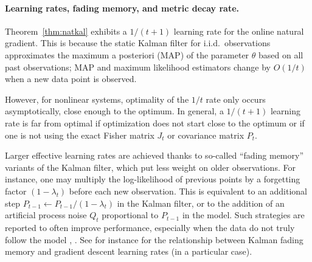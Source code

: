 \documentclass[11pt,a4paper]{article}
\newcommand{\1}{\mathbbm{1}}
\theoremstyle{yannthm}
\theoremstyle{yannthm2}
\numberwithin{equation}{section}
\begin{document}
\paragraph*{Learning rates, fading memory, and metric decay rate.}
Theorem~\ref{thm:natkal} exhibits a $1/(t+1)$ learning rate for the
online natural gradient. This is because the static Kalman filter for
i.i.d.\ observations approximates
the maximum a posteriori (MAP) of the parameter $\theta$ based on all
past observations; MAP and
maximum likelihood estimators change by $O(1/t)$ when a new data point is
observed.

However, for nonlinear systems, optimality of the $1/t$ rate only occurs
asymptotically, close enough to the optimum.  In general, a $1/(t+1)$
learning rate is far from optimal if optimization does not start close to
the optimum or if one is not using the exact Fisher matrix $J_t$ or
covariance matrix $P_t$.

Larger effective learning rates are achieved thanks to so-called ``fading
memory'' variants of the Kalman filter, which put less weight on older
observations. For instance, one may multiply the log-likelihood of
previous points by a forgetting factor $(1-\lambda_t)$ before each new
observation. This is equivalent to an additional step $P_{t-1}\gets
P_{t-1}/(1-\lambda_t)$ in the Kalman filter, or to the addition of an
artificial process noise $Q_t$ proportional to $P_{t-1}$ in the model. Such
strategies are reported to often improve performance,
especially when the data do not truly follow the model
\cite[\S5.5, \S7.4]{simon2006kalmanbook}, \cite[\S5.2.2]{Haykin_book}.
See for instance \cite{bertsekas96} for the relationship between Kalman fading
memory and gradient descent learning rates (in a particular case).
\end{document}
